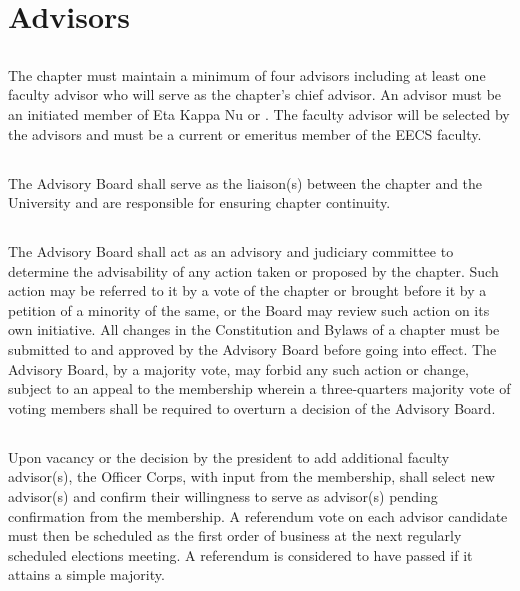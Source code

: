 \chapter{Advisors}\label{sec:advisors}

\section{}
The chapter must maintain a minimum of four advisors including at least one faculty advisor who will serve as the chapter's chief advisor. An advisor must be an initiated member of Eta Kappa Nu or \hkn. The faculty advisor will be selected by the advisors and must be a current or emeritus member of the EECS faculty.

\section{}
The Advisory Board shall serve as the liaison(s) between the chapter and the University and are responsible for ensuring chapter continuity.

\section{}
The Advisory Board shall act as an advisory and judiciary committee to determine the advisability of any action taken or proposed by the chapter. Such action may be referred to it by a vote of the chapter or brought before it by a petition of a minority of the same, or the Board may review such action on its own initiative. All changes in the Constitution and Bylaws of a chapter must be submitted to and approved by the Advisory Board before going into effect. The Advisory Board, by a majority vote, may forbid any such action or change, subject to an appeal to the membership wherein a three-quarters majority vote of voting members shall be required to overturn a decision of the Advisory Board.

\section{}
Upon vacancy or the decision by the president to add additional faculty advisor(s), the Officer Corps, with input from the membership, shall select  new advisor(s) and confirm their willingness to serve as advisor(s) pending confirmation from the membership. A referendum vote on each advisor candidate must then be scheduled as the first order of business at the next regularly scheduled elections meeting. A referendum is considered to have passed if it attains a simple majority.

